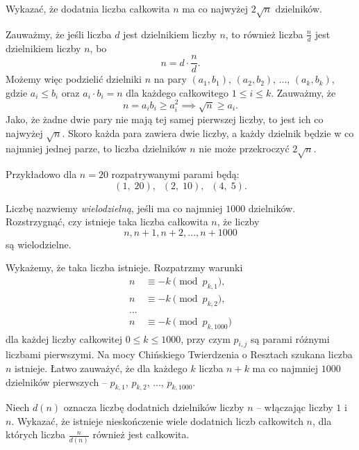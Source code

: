 \newpage
{}

\begin{problem}{1}
	Wykazać, że dodatnia liczba całkowita $n$ ma co najwyżej $2\sqrt{n}$ dzielników.
\end{problem}

\noindent
Zauważmy, że jeśli liczba $d$ jest dzielnikiem liczby $n$, to również liczba $\frac{n}{d}$ jest dzielnikiem liczby $n$, bo
\[
	n = d \cdot \frac{n}{d}.
\]
Możemy więc podzielić dzielniki $n$ na pary $(a_1, b_1)$, $(a_2, b_2)$, ..., $(a_k, b_k)$, gdzie $a_i \leqslant b_i$ oraz $a_i \cdot b_i = n$ dla każdego całkowitego $1 \leqslant i \leqslant k$. Zauważmy, że
\[
	n = a_ib_i \geqslant a_i^2 \implies \sqrt{n} \geqslant a_i.
\]
Jako, że żadne dwie pary nie mają tej samej pierwszej liczby, to jest ich co najwyżej $\sqrt{n}$. Skoro każda para zawiera dwie liczby, a każdy dzielnik będzie w co najmniej jednej parze, to liczba dzielników $n$ nie może przekroczyć $2\sqrt{n}$.

\vspace{10px}
\noindent
Przykładowo dla $n = 20$ rozpatrywanymi parami będą:
\[
	(1,\; 20), \;\; (2,\; 10), \;\; (4,\; 5).
\]

\begin{problem}{2}
	Liczbę nazwiemy \textit{wielodzielną}, jeśli ma co najmniej $1000$ dzielników. Rozstrzygnąć, czy istnieje taka liczba całkowita $n$, że liczby
	\[
		n, n + 1, n + 2, ..., n + 1000
	\]
	są wielodzielne.
\end{problem}

\noindent
Wykażemy, że taka liczba istnieje. Rozpatrzmy warunki
\begin{align*}
	n &\equiv -k \pmod{p_{k, 1}}, \\
	n &\equiv -k \pmod{p_{k, 2}}, \\
	... \\
	n &\equiv -k \pmod{p_{k, 1000}}
\end{align*}
dla każdej liczby całkowitej $0 \leqslant k \leqslant 1000$, przy czym $p_{i, j}$ są parami różnymi liczbami pierwszymi. Na mocy Chińskiego Twierdzenia o Resztach szukana liczba $n$ istnieje. Łatwo zauważyć, że dla każdego $k$ liczba $n + k$ ma co najmniej $1000$ dzielników pierwszych -- $p_{k, 1}$, $p_{k, 2}$, ..., $p_{k, 1000}$.

\begin{problem}{3}
	Niech $d(n)$ oznacza liczbę dodatnich dzielników liczby $n$ -- włączając liczby $1$ i $n$. Wykazać, że istnieje nieskończenie wiele dodatnich liczb całkowitch $n$, dla których liczba $\frac{n}{d(n)}$ również jest całkowita.
\end{problem}

